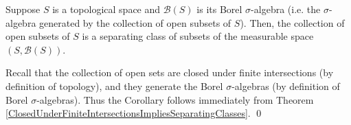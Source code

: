 
\begin{corollary}\label{OpenSetsFormSeparatingClass}\quad
Suppose $S$ is a topological space and $\mathcal{B}(S)$ is its Borel $\sigma$-algebra
(i.e. the $\sigma$-algebra generated by the collection of open subsets of $S$).
Then, the collection of open subsets of $S$ is a separating class of subsets of
the measurable space $\left(S,\mathcal{B}(S)\right)$.
\end{corollary}
\proof
Recall that the collection of open sets are closed under finite intersections (by definition of topology),
and they generate the Borel $\sigma$-algebras (by definition of Borel $\sigma$-algebras).
Thus the Corollary follows immediately from
Theorem \ref{ClosedUnderFiniteIntersectionsImpliesSeparatingClasses}.
\qed

